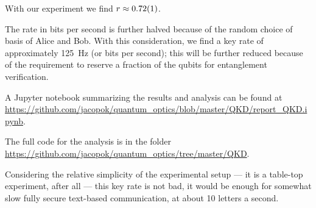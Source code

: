 \documentclass[main.tex]{subfiles}
\begin{document}
With our experiment we find \(r \approx \num{0.72+-0.01}\). 

The rate in bits per second is further halved because of the random choice of basis of Alice and Bob.
With this consideration, we find a key rate of approximately \SI{125}{Hz} (or bits per second); this will be further reduced because of the requirement to reserve a fraction of the qubits for entanglement verification.

A Jupyter notebook summarizing the results and analysis can be found at \url{https://github.com/jacopok/quantum_optics/blob/master/QKD/report_QKD.ipynb}.

The full code for the analysis is in the folder \url{https://github.com/jacopok/quantum_optics/tree/master/QKD}.

Considering the relative simplicity of the experimental setup --- it is a table-top experiment, after all --- this key rate is not bad, it would be enough for somewhat slow fully secure text-based communication, at about 10 letters a second. 
\end{document}
